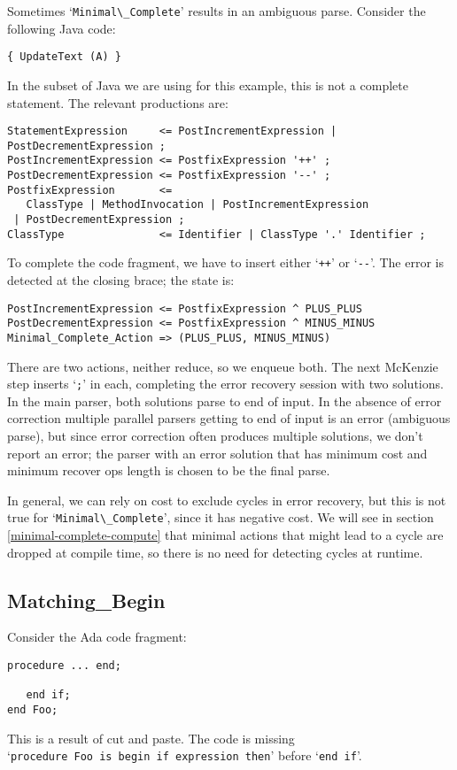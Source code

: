 \documentclass[authordraft]{acmart}
\newcommand{\code}[1]{`\lstinline|#1|'}
\begin{document}
Sometimes \code{Minimal\_Complete} results in an ambiguous
parse. Consider the following Java code:
\begin{lstlisting}
{ UpdateText (A) }
\end{lstlisting}
In the subset of Java we are using for this example, this is not a
complete statement. The relevant productions are:
\begin{verbatim}
StatementExpression     <= PostIncrementExpression | PostDecrementExpression ;
PostIncrementExpression <= PostfixExpression '++' ;
PostDecrementExpression <= PostfixExpression '--' ;
PostfixExpression       <=
   ClassType | MethodInvocation | PostIncrementExpression
 | PostDecrementExpression ;
ClassType               <= Identifier | ClassType '.' Identifier ;
\end{verbatim}
To complete the code fragment, we have to insert either
\code{++} or \code{--}. The error is detected at the closing brace;
the state is:
\begin{verbatim}
PostIncrementExpression <= PostfixExpression ^ PLUS_PLUS
PostDecrementExpression <= PostfixExpression ^ MINUS_MINUS
Minimal_Complete_Action => (PLUS_PLUS, MINUS_MINUS)
\end{verbatim}
There are two actions, neither reduce, so we enqueue both. The next
McKenzie step inserts \code{;} in each, completing the error recovery
session with two solutions. In the main parser, both solutions parse
to end of input. In the absence of error correction multiple parallel
parsers getting to end of input is an error (ambiguous parse), but
since error correction often produces multiple solutions, we don't
report an error; the parser with an error solution that has minimum
cost and minimum recover ops length is chosen to be the final parse.

In general, we can rely on cost to exclude cycles in error recovery,
but this is not true for \code{Minimal\_Complete}, since it has
negative cost. We will see in section \ref{minimal-complete-compute}
that minimal actions that might lead to a cycle are dropped at
compile time, so there is no need for detecting cycles at runtime.

\subsection{Matching\_Begin}
Consider the Ada code fragment:
\begin{lstlisting}
procedure ... end;

   end if;
end Foo;
\end{lstlisting}
This is a result of cut and paste. The code is missing
\\ \code{procedure Foo is begin if expression then} before
\code{end if}.
\end{document}
